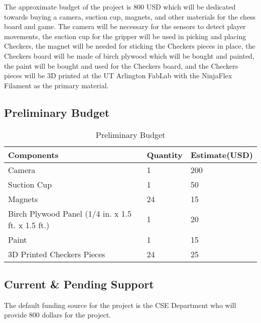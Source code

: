 The approximate budget of the project is 800 USD which will be dedicated towards buying a camera, suction cup, magnets, and other materials for the chess board and game. The camera will be necessary for the sensors to detect player movements, the suction cup for the gripper will be used in picking and placing Checkers, the magnet will be needed for sticking the Checkers pieces in place, the Checkers board will be made of birch plywood which will be bought and painted, the paint will be bought and used for the Checkers board, and the Checkers pieces will be 3D printed at the UT Arlington FabLab with the NinjaFlex Filament as the primary material. 

\subsection{Preliminary Budget}
\begin{table}[h]
\begin{center}
\begin{tabular}{ | m{12em} | m{10em}| m{10em} | } 
  \hline
  \textbf{Components} & \textbf{Quantity} & \textbf{Estimate(USD)} \\
  \hline
  Camera & 1 & 200 \\ 
  \hline
  Suction Cup & 1 & 50 \\ 
  \hline
  Magnets & 24 & 15 \\
  \hline
  Birch Plywood Panel (1/4 in. x 1.5 ft. x 1.5 ft.) & 1 & 20 \\ %
  \hline
  Paint & 1 & 15 \\
  \hline
  3D Printed Checkers Pieces & 24 & 25 \\
  \hline
\end{tabular}
\caption{Preliminary Budget}
\end{center}
\end{table}
\subsection{Current \& Pending Support}
The default funding source for the project is the CSE Department who will provide 800 dollars for the project.